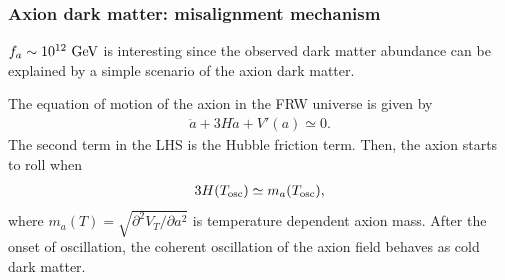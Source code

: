 \documentclass[11pt,a4paper]{article}
\begin{document}
\subsubsection{Axion dark matter: misalignment mechanism}
$f_a \sim 10^{12}~{\rm GeV}$ is interesting since the observed dark matter abundance can be explained by a simple scenario of the axion dark matter. 

The equation of motion of the axion in the FRW universe is given by
\begin{align}
    \ddot a + 3 H \dot a + V'(a) \simeq 0.
\end{align}
The second term in the LHS is the Hubble friction term. Then, the axion starts to roll when
\begin{align}
    3H(T_{\rm osc}) \simeq m_a(T_{\rm osc}),
\end{align}
where $m_a(T) = \sqrt{\partial^2 V_T/\partial a^2}$ is temperature dependent axion mass.
After the onset of oscillation, the coherent oscillation of the axion field behaves as cold dark matter.
\end{document}
